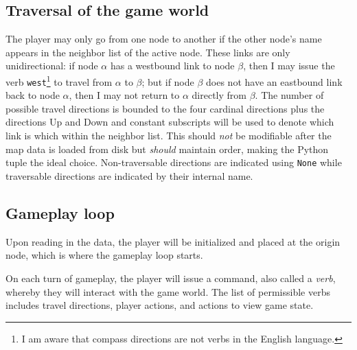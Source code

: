 \documentclass[11pt,letterpaper]{article}
\begin{document}
\subsection{Traversal of the game world}
The player may only go from one node to another if the other node's name appears in the neighbor list of the active node.  These links are only unidirectional: if node $\alpha$ has a westbound link to node $\beta$, then I may issue the verb \verb!west!\footnote{I am aware that compass directions are not verbs in the English language.} to travel from $\alpha$ to $\beta$; but if node $\beta$ does not have an eastbound link back to node $\alpha$, then I may not return to $\alpha$ directly from $\beta$.  The number of possible travel directions is bounded to the four cardinal directions plus the directions Up and Down and constant subscripts will be used to denote which link is which within the neighbor list.  This should {\it not} be modifiable after the map data is loaded from disk but {\it should} maintain order, making the Python tuple the ideal choice.  Non-traversable directions are indicated using \verb!None! while traversable directions are indicated by their internal name.

\subsection{Gameplay loop}
Upon reading in the data, the player will be initialized and placed at the origin node, which is where the gameplay loop starts.

On each turn of gameplay, the player will issue a command, also called a {\it verb}, whereby they will interact with the game world.  The list of permissible verbs includes travel directions, player actions, and actions to view game state.
\end{document}
